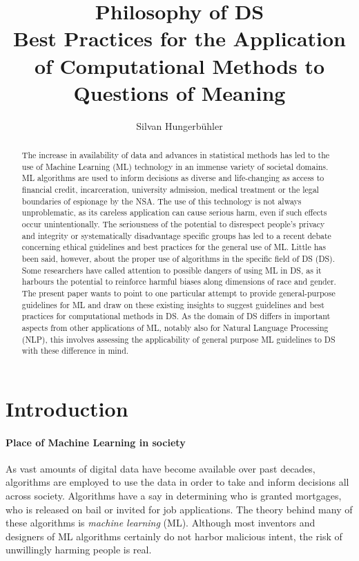 \documentclass{article}
\title{Philosophy of DS\\
\large Best Practices for the Application of Computational Methods to Questions of Meaning}
\date{}
\author{Silvan Hungerb{\"u}hler}
\begin{document}
\maketitle
\begin{abstract}
The increase in availability of data and advances in statistical methods has led to the use of Machine Learning (ML) technology in an immense variety of societal domains. ML algorithms are used to inform decisions as diverse and life-changing as access to financial credit, incarceration, university admission, medical treatment or the legal boundaries of espionage by the NSA.
The use of this technology is not always unproblematic, as its careless application can cause serious harm, even if such effects occur unintentionally.
The seriousness of the potential to disrespect people's privacy and integrity or systematically disadvantage specific groups has led to a recent debate concerning ethical guidelines and best practices for the general use of ML.
Little has been said, however, about the proper use of algorithms in the specific field of DS (DS). Some researchers have called attention to possible dangers of using ML in DS, as it harbours the potential to reinforce harmful biases along dimensions of race and gender.
The present paper wants to point to one particular attempt to provide general-purpose guidelines for ML and draw on these existing insights to suggest guidelines and best practices for computational methods in DS.
As the domain of DS differs in important aspects from other applications of ML, notably also for Natural Language Processing (NLP),
this involves assessing  the applicability of general purpose ML guidelines to DS with these difference in mind.
\end{abstract}
\section{Introduction}
\paragraph{Place of Machine Learning in society}
As vast amounts of digital data have become available over past decades, algorithms are employed to use the data in order to take and inform decisions all across society. 
Algorithms have a say in determining who is granted mortgages, who is released on bail or invited for job applications. 
\cite{algorithms2016}
The theory behind many of these algorithms is \emph{machine learning} (ML).
Although most inventors and designers of ML algorithms certainly do not harbor malicious intent, the risk of unwillingly harming people is real.
\end{document}
